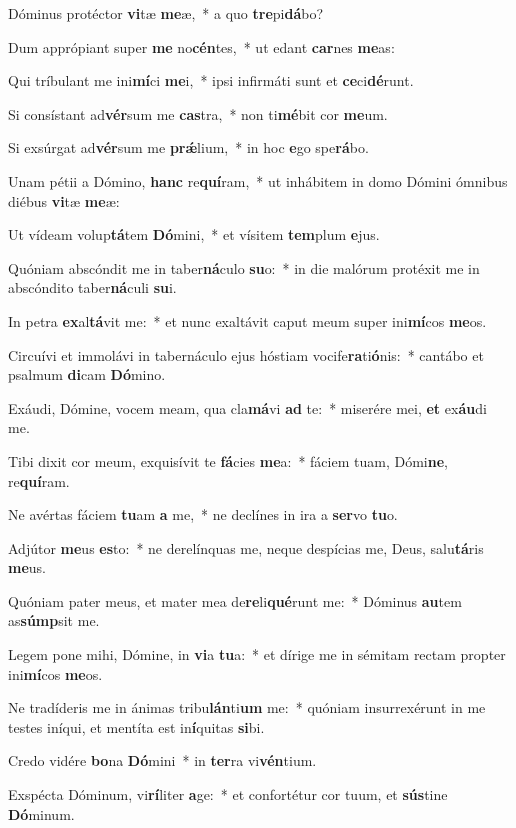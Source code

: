 \item Dóminus protéctor \textbf{vi}tæ \textbf{me}æ,~* a quo \textbf{tre}pi\textbf{dá}bo?
\item Dum apprópiant super \textbf{me} no\textbf{cén}tes,~* ut edant \textbf{car}nes \textbf{me}as:
\item Qui tríbulant me ini\textbf{mí}ci \textbf{me}i,~* ipsi infirmáti sunt et \textbf{ce}ci\textbf{dé}runt.
\item Si consístant ad\textbf{vér}sum me \textbf{cas}tra,~* non ti\textbf{mé}bit cor \textbf{me}um.
\item Si exsúrgat ad\textbf{vér}sum me \textbf{prǽ}lium,~* in hoc \textbf{e}go spe\textbf{rá}bo.
\item Unam pétii a Dómino, \textbf{hanc} re\textbf{quí}ram,~* ut inhábitem in domo Dómini ómnibus diébus \textbf{vi}tæ \textbf{me}æ:
\item Ut vídeam volup\textbf{tá}tem \textbf{Dó}mini,~* et vísitem \textbf{tem}plum \textbf{e}jus.
\item Quóniam abscóndit me in taber\textbf{ná}culo \textbf{su}o:~* in die malórum protéxit me in abscóndito taber\textbf{ná}culi \textbf{su}i.
\item In petra \textbf{ex}al\textbf{tá}vit me:~* et nunc exaltávit caput meum super ini\textbf{mí}cos \textbf{me}os.
\item Circuívi et immolávi in tabernáculo ejus hóstiam vocife\textbf{ra}ti\textbf{ó}nis:~* cantábo et psalmum \textbf{di}cam \textbf{Dó}mino.
\item Exáudi, Dómine, vocem meam, qua cla\textbf{má}vi \textbf{ad} te:~* miserére mei, \textbf{et} ex\textbf{áu}di me.
\item Tibi dixit cor meum, exquisívit te \textbf{fá}cies \textbf{me}a:~* fáciem tuam, Dómi\textbf{ne}, re\textbf{quí}ram.
\item Ne avértas fáciem \textbf{tu}am \textbf{a} me,~* ne declínes in ira a \textbf{ser}vo \textbf{tu}o.
\item Adjútor \textbf{me}us \textbf{es}to:~* ne derelínquas me, neque despícias me, Deus, salu\textbf{tá}ris \textbf{me}us.
\item Quóniam pater meus, et mater mea de\textbf{re}li\textbf{qué}runt me:~* Dóminus \textbf{au}tem as\textbf{súmp}sit me.
\item Legem pone mihi, Dómine, in \textbf{vi}a \textbf{tu}a:~* et dírige me in sémitam rectam propter ini\textbf{mí}cos \textbf{me}os.
\item Ne tradíderis me in ánimas tribu\textbf{lán}ti\textbf{um} me:~* quóniam insurrexérunt in me testes iníqui, et mentíta est in\textbf{í}quitas \textbf{si}bi.
\item Credo vidére \textbf{bo}na \textbf{Dó}mini~* in \textbf{ter}ra vi\textbf{vén}tium.
\item Exspécta Dóminum, vi\textbf{rí}liter \textbf{a}ge:~* et confortétur cor tuum, et \textbf{sús}tine \textbf{Dó}minum.
